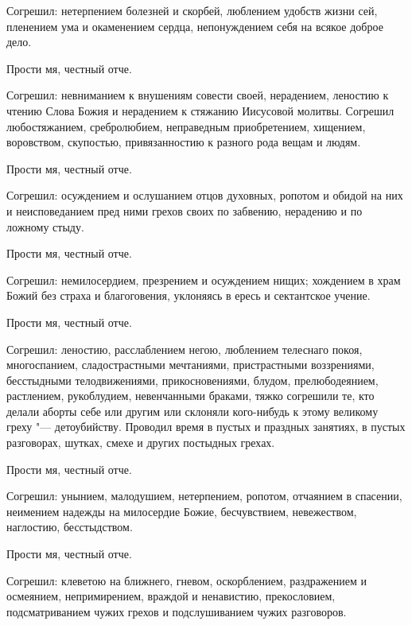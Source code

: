 \begin{mymulticols}
Согрешил: нетерпением болезней и скорбей, люблением удобств жизни сей, пленением ума и окаменением сердца, непонуждением себя на всякое доброе дело. 



Прости мя, честный отче. 



Согрешил: невниманием к внушениям совести своей, нерадением, леностию к чтению Слова Божия и нерадением к стяжанию Иисусовой молитвы. Согрешил любостяжанием, сребролюбием, неправедным приобретением, хищением, воровством, скупостью, привязанностию к разного рода вещам и людям. 



Прости мя, честный отче. 



Согрешил: осуждением и ослушанием отцов духовных, ропотом и обидой на них и неисповеданием пред ними грехов своих по забвению, нерадению и по ложному стыду. 



Прости мя, честный отче. 



Согрешил: немилосердием, презрением и осуждением нищих; хождением в храм Божий без страха и благоговения, уклоняясь в ересь и сектантское учение. 



Прости мя, честный отче. 



Согрешил: леностию, расслаблением негою, люблением телеснаго покоя, многоспанием, сладострастными мечтаниями, пристрастными воззрениями, бесстыдными телодвижениями, прикосновениями, блудом, прелюбодеянием, растлением, рукоблудием, невенчанными браками, тяжко согрешили те, кто делали аборты себе или другим или склоняли кого-нибудь к этому великому греху "--- детоубийству. Проводил время в пустых и праздных занятиях, в пустых разговорах, шутках, смехе и других постыдных грехах. 



Прости мя, честный отче. 



Согрешил: унынием, малодушием, нетерпением, ропотом, отчаянием в спасении, неимением надежды на милосердие Божие, бесчувствием, невежеством, наглостию, бесстыдством. 



Прости мя, честный отче. 



Согрешил: клеветою на ближнего, гневом, оскорблением, раздражением и осмеянием, непримирением, враждой и ненавистию, прекословием, подсматриванием чужих грехов и подслушиванием чужих разговоров. 




\end{mymulticols}
